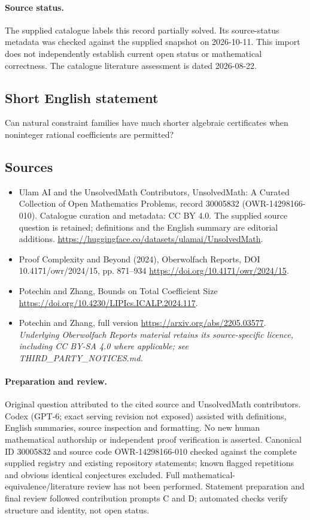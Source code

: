 \documentclass[11pt]{article}
\begin{document}
\paragraph{Source status.}
The supplied catalogue labels this record partially solved. Its source-status metadata was checked against the supplied snapshot on 2026-10-11. This import does not independently establish current open status or mathematical correctness. The catalogue literature assessment is dated 2026-08-22.
\subsection{Short English statement}
Can natural constraint families have much shorter algebraic certificates when noninteger rational coefficients are permitted?
\subsection{Sources}
\begin{itemize}
\item[\hypertarget{source:30005832:1}{S1}] Ulam AI and the UnsolvedMath Contributors, UnsolvedMath: A Curated Collection of Open Mathematics Problems, record 30005832 (OWR-14298166-010). Catalogue curation and metadata: CC BY 4.0. The supplied source question is retained; definitions and the English summary are editorial additions.
\url{https://huggingface.co/datasets/ulamai/UnsolvedMath}.
\item[\hypertarget{source:30005832:2}{S2}] Proof Complexity and Beyond (2024), Oberwolfach Reports, DOI 10.4171/owr/2024/15, pp. 871--934
\url{https://doi.org/10.4171/owr/2024/15}.
\item[\hypertarget{source:30005832:3}{S3}] Potechin and Zhang, Bounds on Total Coefficient Size
\url{https://doi.org/10.4230/LIPIcs.ICALP.2024.117}.
\item[\hypertarget{source:30005832:4}{S4}] Potechin and Zhang, full version
\url{https://arxiv.org/abs/2205.03577}.
\textit{Underlying Oberwolfach Reports material retains its source-specific licence, including CC BY-SA 4.0 where applicable; see THIRD\_PARTY\_NOTICES.md.}
\end{itemize}
\paragraph{Preparation and review.}
Original question attributed to the cited source and UnsolvedMath contributors. Codex (GPT-6; exact serving revision not exposed) assisted with definitions, English summaries, source inspection and formatting. No new human mathematical authorship or independent proof verification is asserted. Canonical ID 30005832 and source code OWR-14298166-010 checked against the complete supplied registry and existing repository statements; known flagged repetitions and obvious identical conjectures excluded. Full mathematical-equivalence/literature review has not been performed. Statement preparation and final review followed contribution prompts C and D; automated checks verify structure and identity, not open status.
\label{end:30005832}
\end{document}

